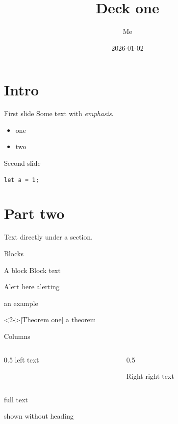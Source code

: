 \documentclass[presentation]{beamer}
\author{Me}
\date{2026-01-02}
\title{Deck \alert{one}}
\begin{document}
\maketitle
\tableofcontents
\section{Intro}
\label{sec:org5cce58b}
\begin{frame}[label={sec:org41cdc78}]{First slide}
Some text with \emph{emphasis}.
\begin{itemize}
\item one
\item two
\end{itemize}
\end{frame}
\begin{frame}[fragile,label=sec2]{Second slide}
 \begin{verbatim}
let a = 1;
\end{verbatim}
\end{frame}
\section{Part two}
\label{sec:org3c2ffd4}
Text directly under a section.
\begin{frame}[label={sec:orgc8e0050}]{Blocks}
\begin{block}{A block}
Block text
\end{block}
\begin{alertblock}{Alert here}
alerting
\end{alertblock}
\begin{example}
an example
\end{example}
\begin{theorem}<2->[Theorem one]
a theorem
\end{theorem}
\end{frame}
\begin{frame}[label={sec:orgd51a734}]{Columns}
\begin{columns}
\begin{column}{0.5\columnwidth}
left text
\end{column}
\begin{column}{0.5\columnwidth}
\begin{block}{Right}
right text
\end{block}
\end{column}
\end{columns}
\end{frame}
\begin{frame}[label={sec:org787b225}]{}
full text
\end{frame}
\appendix
{}
shown without heading
\end{document}
